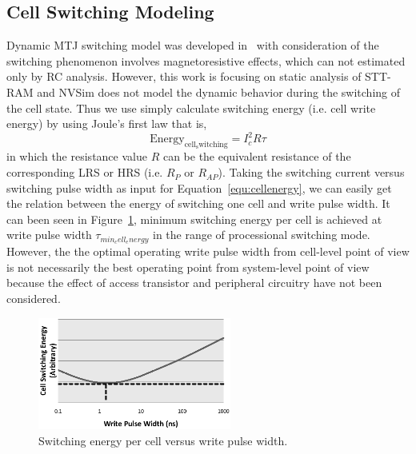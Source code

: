 \subsection{Cell Switching Modeling}
Dynamic MTJ switching model was developed in~\cite{STTRAM:Purdue10} with consideration of the switching phenomenon involves magnetoresistive effects, which can not estimated only by RC analysis.  However, this work is focusing on static analysis of STT-RAM and NVSim does not model the dynamic behavior during the switching of the cell state. Thus we use simply calculate switching energy (i.e. cell write energy) by using Joule's first law that is,
\begin{equation}
\mathrm{Energy}_{\mathrm{cell_switching}} = I_{c}^2 R \tau \label{equ:cellenergy}
\end{equation}
in which the resistance value $R$ can be the equivalent resistance of the corresponding LRS or HRS (i.e. $R_{P}$ or $R_{AP}$). Taking the switching current versus switching pulse width as input for Equation~\ref{equ:cellenergy}, we can easily get the relation between the energy of switching one cell and write pulse width. It can been seen in Figure~\ref{fig:cellenergy}, minimum switching energy per cell is achieved at write pulse width $\tau_{min_cell_energy}$ in the range of processional switching mode. However, the the optimal operating write pulse width from cell-level point of view is not necessarily the best operating point from system-level point of view because the effect of access transistor and peripheral circuitry have not been considered.
\begin{figure}[t]
  \centering
  \includegraphics[width=2.5in]{fig/cellenergy.eps}
  \caption{Switching energy per cell versus write pulse width.}
  \label{fig:cellenergy}
\end{figure}

